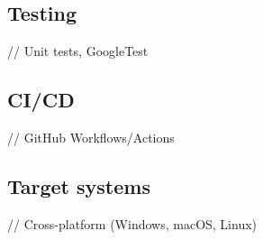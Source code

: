 
\subsection{Testing}\label{subsec:testing}

// Unit tests, GoogleTest

\subsection{CI/CD}\label{subsec:ci/cd}

// GitHub Workflows/Actions

\subsection{Target systems}\label{subsec:target-systems}

// Cross-platform (Windows, macOS, Linux)
